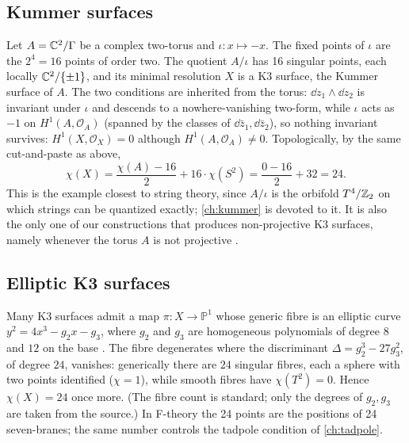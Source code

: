 \subsection{Kummer surfaces}

Let $A=\mathbb{C}^2/\Gamma$ be a complex two-torus and $\iota:x\mapsto-x$. The fixed points of $\iota$
are the $2^4=16$ points of order two. The quotient $A/\iota$ has 16 singular points, each
locally $\mathbb{C}^2/\{\pm1\}$, and its minimal resolution $X$ is a K3 surface, the Kummer surface of
$A$. \TL{} 
The two conditions are inherited from the torus: $\dd z_1\wedge\dd z_2$ is invariant under
$\iota$ and descends to a nowhere-vanishing two-form, while $\iota$ acts as $-1$ on
$H^1(A,\mathcal{O}_A)$ (spanned by the classes of $\dd\bar z_1,\dd\bar z_2$), so nothing
invariant survives: $H^1(X,\mathcal{O}_X)=0$ although $H^1(A,\mathcal{O}_A)\neq0$.
Topologically, by the same cut-and-paste as above,
\begin{equation}\label{eq:k3:kummerchi}
  \chi(X)=\frac{\chi(A)-16}{2}+16\cdot\chi(S^2)=\frac{0-16}{2}+32=24 .
\end{equation}
This is the example closest to string theory, since $A/\iota$ is the orbifold $T^4/\mathbb{Z}_2$ on
which strings can be quantized exactly; \cref{ch:kummer} is devoted to it. It is also the only
one of our constructions that produces non-projective K3 surfaces, namely whenever the torus $A$
is not projective .

\subsection{Elliptic K3 surfaces}

Many K3 surfaces admit a map $\pi:X\to\mathbb{P}^1$ whose generic fibre is an elliptic curve
$y^2=4x^3-g_2x-g_3$, where $g_2$ and $g_3$ are homogeneous polynomials of degree $8$ and $12$ on
the base . The fibre degenerates where the discriminant
$\Delta=g_2^3-27g_3^2$, of degree $24$, vanishes: generically there are $24$ singular fibres,
each a sphere with two points identified ($\chi=1$), while smooth fibres have $\chi(T^2)=0$.
Hence $\chi(X)=24$ once more. (The fibre count is standard; only the degrees of $g_2,g_3$ are
taken from the source.) In F-theory the 24 points are the positions of 24 seven-branes; the
same number controls the tadpole condition of \cref{ch:tadpole}.

